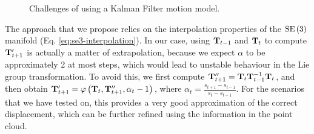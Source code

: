 \begin{figure}
	\centering
	\hspace{1pt}
	\caption[Motion model challenges]{Challenges of using a Kalman Filter motion model.}
	\label{fig:motion-pred-trouble}
\end{figure}


The approach that we propose relies on the interpolation properties of the $\operatorname{SE}\left(3\right)$ manifold (Eq. \ref{eq:se3-interpolation}). In our case, using $\mathbf{T}_{t-1}$ and $\mathbf{T}_{t}$ to compute $\mathbf{T}_{t+1}'$ is actually a matter of extrapolation, because we expect $\alpha$ to be approximately 2 at most steps, which would lead to unstable behaviour in the Lie group transformation. To avoid this, we first compute $\mathbf{T}_{t+1}'' = \mathbf{T}_{t}\mathbf{T}_{t-1}^{-1}\mathbf{T}_{t}$, and then obtain $\mathbf{T}_{t+1}' = \varphi\left(\mathbf{T}_t, \mathbf{T}_{t+1}'', \alpha_{t}-1\right)$, where $\alpha_{t}= \frac{s_{t+1} - s_{t-1}}{s_t - s_{t-1}}$. For the scenarios that we have tested on, this provides a very good approximation of the correct displacement, which can be further refined using the information in the point cloud.

